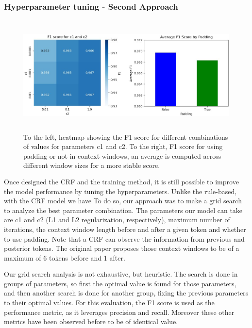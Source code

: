 \documentclass{article}
\begin{document}
\subsubsection*{Hyperparameter tuning - Second Approach}
\begin{figure}[!t]
	\centering
	\includegraphics[height=6cm]{images/crf_heatmap_bars.jpg}
	\captionsetup{width=0.9\textwidth}
	\caption{To the left, heatmap showing the F1 score for different combinations of values for parameters
	c1 and c2. To the right, F1 score for using padding or not in context windows, an average is computed
	across different window sizes for a more stable score.}
	\label{fig:crf_heatmap_bars}
\end{figure}

Once designed the CRF and the training method, it is still possible to improve the model performance
by tuning the hyperparameters. Unlike the rule-based, with the CRF model we have  To do so, our approach
was to make a grid search to analyze the best parameter combination. The parameters our model can take
are c1 and c2 (L1 and L2 regularization, respectively), maximum number of iterations, the context window
length before and after a given token and whether to use padding. Note that a CRF can observe the information
from previous and posterior tokens. The original paper proposes those context windows to be of a maximum of 6
tokens before and 1 after.

Our grid search analysis is not exhaustive, but heuristic. The search is done in groups of parameters, so
first the optimal value is found for those parameters, and then another search is done for another group,
fixing the previous parameters to their optimal values. For this evaluation, the F1 score is used as the
performance metric, as it leverages precision and recall. Moreover these other metrics have been observed
before to be of identical value.
\end{document}
